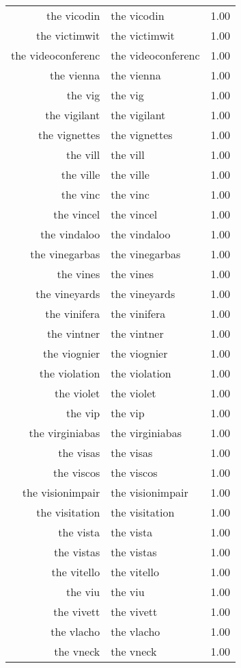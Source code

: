 \begin{table}[ht]
\begin{tabular}{rlr}
  the vicodin & the vicodin & 1.00 \\ 
  the victimwit & the victimwit & 1.00 \\ 
  the videoconferenc & the videoconferenc & 1.00 \\ 
  the vienna & the vienna & 1.00 \\ 
  the vig & the vig & 1.00 \\ 
  the vigilant & the vigilant & 1.00 \\ 
  the vignettes & the vignettes & 1.00 \\ 
  the vill & the vill & 1.00 \\ 
  the ville & the ville & 1.00 \\ 
  the vinc & the vinc & 1.00 \\ 
  the vincel & the vincel & 1.00 \\ 
  the vindaloo & the vindaloo & 1.00 \\ 
  the vinegarbas & the vinegarbas & 1.00 \\ 
  the vines & the vines & 1.00 \\ 
  the vineyards & the vineyards & 1.00 \\ 
  the vinifera & the vinifera & 1.00 \\ 
  the vintner & the vintner & 1.00 \\ 
  the viognier & the viognier & 1.00 \\ 
  the violation & the violation & 1.00 \\ 
  the violet & the violet & 1.00 \\ 
  the vip & the vip & 1.00 \\ 
  the virginiabas & the virginiabas & 1.00 \\ 
  the visas & the visas & 1.00 \\ 
  the viscos & the viscos & 1.00 \\ 
  the visionimpair & the visionimpair & 1.00 \\ 
  the visitation & the visitation & 1.00 \\ 
  the vista & the vista & 1.00 \\ 
  the vistas & the vistas & 1.00 \\ 
  the vitello & the vitello & 1.00 \\ 
  the viu & the viu & 1.00 \\ 
  the vivett & the vivett & 1.00 \\ 
  the vlacho & the vlacho & 1.00 \\ 
  the vneck & the vneck & 1.00 \\ 

\end{tabular}
\end{table}
